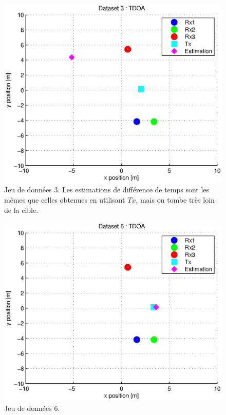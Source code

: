 \documentclass[10pt,a4paper]{article}
\begin{document}
\begin{figure}[h]
\centering
\includegraphics[scale = 0.5]{TDOA3}
\caption{Jeu de données 3. Les estimations de différence de temps sont les mêmes que celles obtenues en utilisant $Tx$, mais on tombe très loin de la cible.}
\label{ex2}
\end{figure}

\begin{figure}[h]
\centering
\includegraphics[scale = 0.5]{TDOA6}
\caption{Jeu de données 6.}
\label{ex3}
\end{figure}
\end{document}
